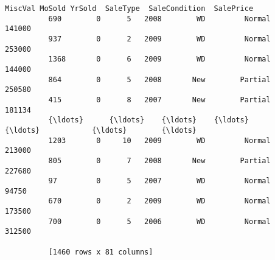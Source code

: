 \documentclass[11pt]{article}
\begin{document}
\begin{Verbatim}[commandchars=\\\{\}]
               MiscVal MoSold YrSold  SaleType  SaleCondition  SalePrice  
          690        0      5   2008        WD         Normal     141000  
          937        0      2   2009        WD         Normal     253000  
          1368       0      6   2009        WD         Normal     144000  
          864        0      5   2008       New        Partial     250580  
          415        0      8   2007       New        Partial     181134  
          {\ldots}      {\ldots}    {\ldots}    {\ldots}       {\ldots}            {\ldots}        {\ldots}  
          1203       0     10   2009        WD         Normal     213000  
          805        0      7   2008       New        Partial     227680  
          97         0      5   2007        WD         Normal      94750  
          670        0      2   2009        WD         Normal     173500  
          700        0      5   2006        WD         Normal     312500  
          
          [1460 rows x 81 columns]
\end{Verbatim}
            
\end{document}
